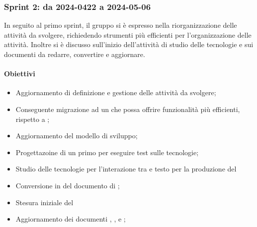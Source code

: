 \subsubsection{Sprint 2: da 2024-0422 a 2024-05-06}
In seguito al primo sprint, il gruppo si è espresso nella riorganizzazione delle attività da svolgere, richiedendo strumenti più efficienti per l'organizzazione delle attività. Inoltre si è discusso sull'inizio dell'attività di studio delle tecnologie e sui documenti da redarre, convertire e aggiornare.

\paragraph{Obiettivi}
\begin{itemize}
  \item Aggiornamento di definizione e gestione delle attività da svolgere;
  \item Conseguente migrazione ad un  che possa offrire funzionalità più efficienti, rispetto a ;
  \item Aggiornamento del modello di sviluppo;
  \item Progettazoine di un primo  per eseguire test sulle tecnologie;
  \item Studio delle tecnologie per l'interazione tra  e testo per la produzione del 
  \item Conversione in  del documento di \AnalisiDeiRequisiti;
  \item Stesura iniziale del \PianoDiQualifica
  \item Aggiornamento dei documenti \PianoDiProgetto, \NormeDiProgetto, \Glossario e \AnalisiDeiRequisiti;
\end{itemize}

\vspace{0.5\baselineskip}
\par [Inserire Gantt]